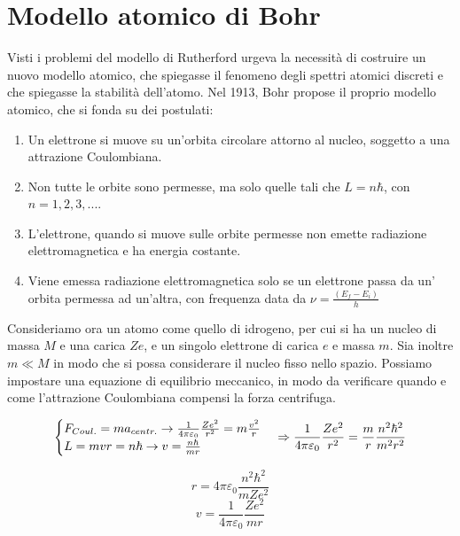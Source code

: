 
\section{Modello atomico di Bohr}

Visti i problemi del modello di Rutherford urgeva la necessità di costruire un nuovo modello atomico, che spiegasse il fenomeno degli spettri atomici discreti e che spiegasse la stabilità dell'atomo.
Nel 1913, Bohr propose il proprio modello atomico, che si fonda su dei postulati:

\begin{enumerate}
\item Un elettrone si muove su un'orbita circolare attorno al nucleo, soggetto a una attrazione Coulombiana.
\item Non tutte le orbite sono permesse, ma solo quelle tali che $L=n\hbar$, con $n=1, 2, 3, ... $.
\item L'elettrone, quando si muove sulle orbite permesse non emette radiazione elettromagnetica e ha energia costante.
\item Viene emessa radiazione elettromagnetica solo se un elettrone passa da un' orbita permessa ad un'altra, con frequenza data da $ \nu = 	\frac{(E_f - E_i)}{h}$
\end{enumerate}

Consideriamo ora un atomo come quello di idrogeno, per cui si ha un nucleo di massa $M$ e una carica $Z e$, e un singolo elettrone di carica $e$ e massa $m$.
Sia inoltre $m \ll M$ in modo che si possa considerare il nucleo fisso nello spazio.
Possiamo impostare una equazione di equilibrio meccanico, in modo da verificare quando e come l'attrazione Coulombiana compensi la forza centrifuga.

\begin{equation}
\begin{cases}
	F_{Coul.} = ma_{centr.} \rightarrow \frac{1}{4\pi \varepsilon_0} \frac{Z e^2}{r^2} = m \frac{v^2}{r} \\
	L = m v r = n \hbar 	\rightarrow 	v = \frac{n \hbar}{m r} 
\end{cases}
\Rightarrow \frac{1}{4\pi \varepsilon_0} \frac{Z e^2}{r^2} = \frac{m}{r} \frac{n^2 \hbar^2}{m^2 r^2} \\
\end{equation}

$$ r = 4\pi\varepsilon_0 \frac{ n^2 \hbar^2}{m Z e^2} $$
$$ v = \frac{1}{4\pi\varepsilon_0} \frac{Z e^2}{m r} $$

